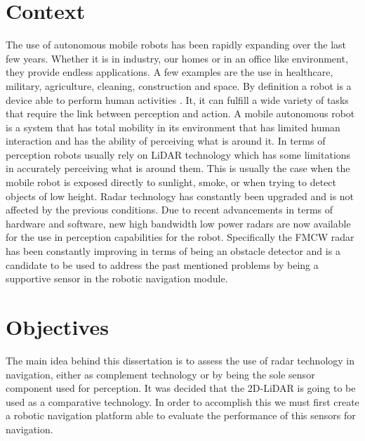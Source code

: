 \section{Context}
The use of autonomous mobile robots has been rapidly expanding over the last few years. Whether it is in industry, our homes or in an office like environment, they provide endless applications. A few examples are the use in healthcare, military, agriculture, cleaning, construction and space.
By definition a robot is a device able to perform human activities \cite{robo}.  It, it can fulfill a wide variety of tasks that require the link between perception and  action. A mobile autonomous robot is a system that has total mobility in its environment that has limited human interaction and has the ability of perceiving what is around it. In terms of perception robots usually rely on \ac{LiDAR} technology which has some limitations in accurately perceiving what is around them. This is usually the case when the mobile robot is exposed directly to sunlight, smoke, or when trying to detect objects of low height. Radar technology has constantly  been  upgraded and is not affected by the previous conditions. Due to recent advancements in terms of hardware and software, new high bandwidth low power radars are now available for the use in perception capabilities for the robot.   
Specifically the \ac{FMCW} \ac{radar} has been constantly improving in terms of being an obstacle detector and  is a candidate to be used to address the past mentioned problems by being a supportive sensor in the robotic navigation module.




\section{Objectives}
The main idea behind this dissertation is to assess the use of \ac{radar} technology in navigation, either as complement technology or by being the sole sensor component used for perception. It was decided that the 2D-\ac{LiDAR} is going to be used as a comparative technology. In order to accomplish this we must first create a robotic navigation platform able to evaluate the performance of this sensors for navigation. 

